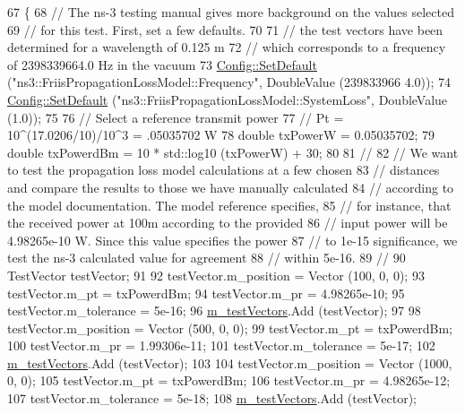 \begin{DoxyCode}
67 \{
68   \textcolor{comment}{// The ns-3 testing manual gives more background on the values selected}
69   \textcolor{comment}{// for this test.  First, set a few defaults. }
70 
71   \textcolor{comment}{// the test vectors have been determined for a wavelength of 0.125 m }
72   \textcolor{comment}{// which corresponds to a frequency of 2398339664.0 Hz in the vacuum}
73   \hyperlink{group__config_ga2e7882df849d8ba4aaad31c934c40c06}{Config::SetDefault} (\textcolor{stringliteral}{"ns3::FriisPropagationLossModel::Frequency"}, DoubleValue (239833966
      4.0));
74   \hyperlink{group__config_ga2e7882df849d8ba4aaad31c934c40c06}{Config::SetDefault} (\textcolor{stringliteral}{"ns3::FriisPropagationLossModel::SystemLoss"}, DoubleValue (1.0));
75 
76   \textcolor{comment}{// Select a reference transmit power}
77   \textcolor{comment}{// Pt = 10^(17.0206/10)/10^3 = .05035702 W}
78   \textcolor{keywordtype}{double} txPowerW = 0.05035702;
79   \textcolor{keywordtype}{double} txPowerdBm = 10 * std::log10 (txPowerW) + 30;
80 
81   \textcolor{comment}{//}
82   \textcolor{comment}{// We want to test the propagation loss model calculations at a few chosen }
83   \textcolor{comment}{// distances and compare the results to those we have manually calculated}
84   \textcolor{comment}{// according to the model documentation.  The model reference specifies, }
85   \textcolor{comment}{// for instance, that the received power at 100m according to the provided}
86   \textcolor{comment}{// input power will be 4.98265e-10 W.  Since this value specifies the power}
87   \textcolor{comment}{// to 1e-15 significance, we test the ns-3 calculated value for agreement }
88   \textcolor{comment}{// within 5e-16.}
89   \textcolor{comment}{//}
90   TestVector testVector;
91 
92   testVector.m\_position = Vector (100, 0, 0);
93   testVector.m\_pt = txPowerdBm;
94   testVector.m\_pr = 4.98265e-10;
95   testVector.m\_tolerance = 5e-16;
96   \hyperlink{classFriisPropagationLossModelTestCase_a9fa3d0d4e10d07b03b540192c8453e00}{m\_testVectors}.Add (testVector);
97 
98   testVector.m\_position = Vector (500, 0, 0);
99   testVector.m\_pt = txPowerdBm;
100   testVector.m\_pr = 1.99306e-11;
101   testVector.m\_tolerance = 5e-17;
102   \hyperlink{classFriisPropagationLossModelTestCase_a9fa3d0d4e10d07b03b540192c8453e00}{m\_testVectors}.Add (testVector);
103 
104   testVector.m\_position = Vector (1000, 0, 0);
105   testVector.m\_pt = txPowerdBm;
106   testVector.m\_pr = 4.98265e-12;
107   testVector.m\_tolerance = 5e-18;
108   \hyperlink{classFriisPropagationLossModelTestCase_a9fa3d0d4e10d07b03b540192c8453e00}{m\_testVectors}.Add (testVector);

\end{DoxyCode}
